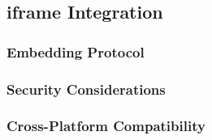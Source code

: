 \subsection{iframe Integration}

\subsubsection{Embedding Protocol}

\subsubsection{Security Considerations}

\subsubsection{Cross-Platform Compatibility}

